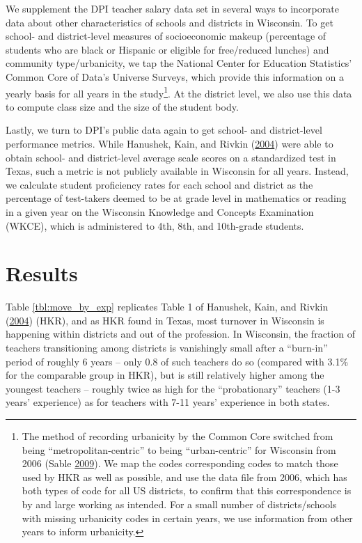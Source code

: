 \documentclass[]{article}
\let\rmarkdownfootnote\footnote%
\def\footnote{\protect\rmarkdownfootnote}
\begin{document}
We supplement the DPI teacher salary data set in several ways to
incorporate data about other characteristics of schools and districts in
Wisconsin. To get school- and district-level measures of socioeconomic
makeup (percentage of students who are black or Hispanic or eligible for
free/reduced lunches) and community type/urbanicity, we tap the National
Center for Education Statistics' Common Core of Data's Universe Surveys,
which provide this information on a yearly basis for all years in the
study\footnote{The method of recording urbanicity by the Common Core
  switched from being ``metropolitan-centric'' to being
  ``urban-centric'' for Wisconsin from 2006 (Sable
  \protect\hyperlink{ref-sable}{2009}). We map the codes corresponding
  codes to match those used by HKR as well as possible, and use the data
  file from 2006, which has both types of code for all US districts, to
  confirm that this correspondence is by and large working as intended.
  For a small number of districts/schools with missing urbanicity codes
  in certain years, we use information from other years to inform
  urbanicity.}. At the district level, we also use this data to compute
class size and the size of the student body.

Lastly, we turn to DPI's public data again to get school- and
district-level performance metrics. While Hanushek, Kain, and Rivkin
(\protect\hyperlink{ref-hanushek}{2004}) were able to obtain school- and
district-level average scale scores on a standardized test in Texas,
such a metric is not publicly available in Wisconsin for all years.
Instead, we calculate student proficiency rates for each school and
district as the percentage of test-takers deemed to be at grade level in
mathematics or reading in a given year on the Wisconsin Knowledge and
Concepts Examination (WKCE), which is administered to 4th, 8th, and
10th-grade students.

\section{Results}\label{results}

Table \ref{tbl:move_by_exp} replicates Table 1 of Hanushek, Kain, and
Rivkin (\protect\hyperlink{ref-hanushek}{2004}) (HKR), and as HKR found
in Texas, most turnover in Wisconsin is happening within districts and
out of the profession. In Wisconsin, the fraction of teachers
transitioning among districts is vanishingly small after a ``burn-in''
period of roughly 6 years -- only 0.8 of such teachers do so (compared
with 3.1\% for the comparable group in HKR), but is still relatively
higher among the youngest teachers -- roughly twice as high for the
``probationary'' teachers (1-3 years' experience) as for teachers with
7-11 years' experience in both states.
\end{document}
